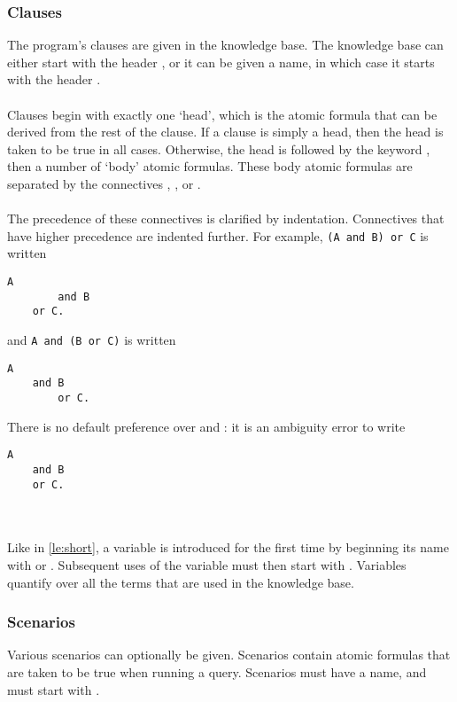 \documentclass[../main.tex]{subfiles}
\begin{document}
\subsubsection{Clauses}
\label{section:knowledge-base}
The program's clauses are given in the knowledge base. The knowledge base can either start with the header , or it can be given a name, in which case it starts with the header . 
\\
\\
Clauses begin with exactly one `head', which is the atomic formula that can be derived from the rest of the clause. If a clause is simply a head, then the head is taken to be true in all cases. Otherwise, the head is followed by the keyword , then a number of `body' atomic formulas. These body atomic formulas are separated by the connectives , , or .
\\ 
\\
The precedence of these connectives is clarified by indentation. Connectives that have higher precedence are indented further. For example, \texttt{(A and B) or C} is written
\newpage
\begin{lstlisting}[language={LE}]
    A
        and B
    or C.
\end{lstlisting}
and \texttt{A and (B or C)} is written
\begin{lstlisting}[language={LE}]
    A
    and B
        or C.
\end{lstlisting}
There is no default preference over  and : it is an ambiguity error to write
\begin{lstlisting}[language={LE}]
    A 
    and B
    or C.
\end{lstlisting}
\\
\\
Like in \ref{le:short}, a variable is introduced for the first time by beginning its name with  or .  Subsequent uses of the variable must then start with . Variables quantify over all the terms that are used in the knowledge base.

\subsubsection{Scenarios}
Various scenarios can optionally be given. Scenarios contain atomic formulas that are taken to be true when running a query. Scenarios must have a name, and must start with 
. 
\end{document}
